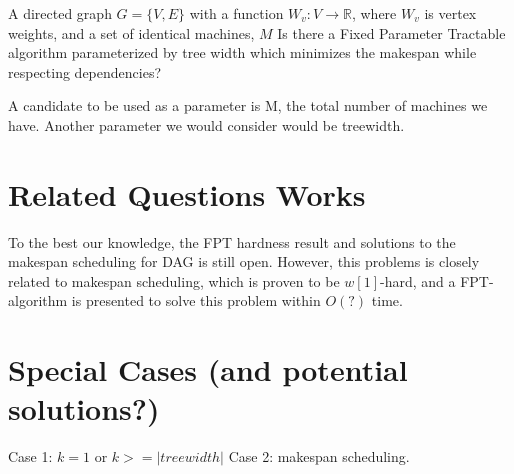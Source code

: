 \documentclass{article}
\begin{document}
%
{A directed graph $G = \{V, E\}$ with a function $W_v: V \to \mathbb{R}$,
 where $W_v$ is vertex weights, and a set of identical machines,
$M$}%
{}%
{Is there a Fixed Parameter Tractable algorithm parameterized by tree width
which  minimizes the makespan while respecting
dependencies?}%

A candidate to be used as a parameter is M, the total number of machines
we have. Another parameter we would consider would be treewidth.

\section{Related Questions Works}
To the best our knowledge, the FPT hardness result and solutions to the 
makespan scheduling for DAG is still open. 
However, this problems is closely related to makespan scheduling, which
is proven to be $w[1]$-hard, and a FPT-algorithm is presented to solve
this problem within $O(?)$ time.



\section{Special Cases (and potential solutions?)}
Case 1: $k = 1$ or $k >= |treewidth|$
Case 2: makespan scheduling.
\end{document}
